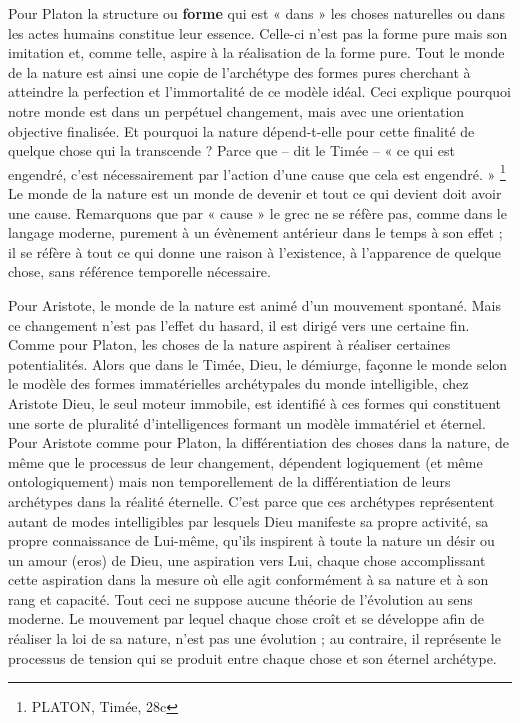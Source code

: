 \documentclass[a4paper,12pt]{article}
\begin{document}
Pour Platon la structure ou  \textbf{forme} qui est « dans » les choses naturelles ou dans les actes humains constitue leur essence. Celle-ci n'est pas la forme pure mais son imitation et, comme telle, aspire à la réalisation de la forme pure. Tout le monde de la nature est ainsi une copie de l'archétype des formes pures cherchant à atteindre la perfection et l'immortalité de ce modèle idéal. Ceci explique pourquoi notre monde est dans un perpétuel changement, mais avec une orientation objective finalisée. Et pourquoi la nature dépend-t-elle pour cette finalité de quelque chose qui la transcende ? Parce que – dit le Timée – « ce qui est engendré, c'est nécessairement par l'action d'une cause que cela est engendré. » \footnote{PLATON, Timée, 28c} Le monde de la nature est un monde de devenir et tout ce qui devient doit avoir une cause. Remarquons que par « cause » le grec ne se réfère pas, comme dans le langage moderne, purement à un évènement antérieur dans le temps à son effet ; il se réfère à tout ce qui donne une raison à l'existence, à l'apparence de quelque chose, sans référence temporelle nécessaire. 

Pour Aristote, le monde de la nature est animé d'un mouvement spontané. Mais ce changement n'est pas l'effet du hasard, il est dirigé vers une certaine fin. Comme pour Platon, les choses de la nature aspirent à réaliser certaines potentialités. Alors que dans le Timée, Dieu, le démiurge, façonne le monde selon le modèle des formes immatérielles archétypales du monde intelligible, chez Aristote Dieu, le seul moteur immobile, est identifié à ces formes qui constituent une sorte de pluralité d'intelligences formant un modèle immatériel et éternel. Pour Aristote comme pour Platon, la différentiation des choses dans la nature, de même que le processus de leur changement, dépendent logiquement (et même ontologiquement) mais non temporellement de la différentiation de leurs archétypes dans la réalité éternelle. C'est parce que ces archétypes représentent autant de modes intelligibles par lesquels Dieu manifeste sa propre activité, sa propre connaissance de Lui-même, qu'ils inspirent à toute la nature un désir ou un amour (eros) de Dieu, une aspiration vers Lui, chaque chose accomplissant cette aspiration dans la mesure où elle agit conformément à sa nature et à son rang et capacité. Tout ceci ne suppose aucune théorie de l'évolution au sens moderne. Le mouvement par lequel chaque chose croît et se développe afin de réaliser la loi de sa nature, n'est pas une évolution ; au contraire, il représente le processus de tension qui se produit entre chaque chose et son éternel archétype. 
\end{document}
